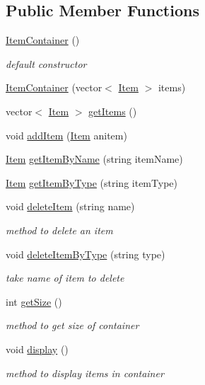 \subsection*{Public Member Functions}
\begin{DoxyCompactItemize}
\item 
\hypertarget{class_item_container_a3ce79c8b4501fafc5ea369ef3b3c1bce}{}\label{class_item_container_a3ce79c8b4501fafc5ea369ef3b3c1bce} 
\hyperlink{class_item_container_a3ce79c8b4501fafc5ea369ef3b3c1bce}{Item\+Container} ()
\begin{DoxyCompactList}\small\item\em default constructor \end{DoxyCompactList}\item 
\hyperlink{class_item_container_ab217646cacad74f4c9af8b5c4a0c26a3}{Item\+Container} (vector$<$ \hyperlink{class_item}{Item} $>$ items)
\item 
vector$<$ \hyperlink{class_item}{Item} $>$ \hyperlink{class_item_container_af941b43394daa4ca6720f5b4acd578e0}{get\+Items} ()
\item 
void \hyperlink{class_item_container_ab693023fa4d471748385cb0ae8a49413}{add\+Item} (\hyperlink{class_item}{Item} anitem)
\item 
\hyperlink{class_item}{Item} \hyperlink{class_item_container_a1a716afac56641809fd09d314ee1da3e}{get\+Item\+By\+Name} (string item\+Name)
\item 
\hyperlink{class_item}{Item} \hyperlink{class_item_container_a891f1db61620ef64a8907bc5554cbb42}{get\+Item\+By\+Type} (string item\+Type)
\item 
void \hyperlink{class_item_container_ac5d279c415c4ef60282c7b87a73a99b5}{delete\+Item} (string name)
\begin{DoxyCompactList}\small\item\em method to delete an item \end{DoxyCompactList}\item 
void \hyperlink{class_item_container_aeb9b5f9389de01eb93e44993251c2170}{delete\+Item\+By\+Type} (string type)
\begin{DoxyCompactList}\small\item\em take name of item to delete \end{DoxyCompactList}\item 
int \hyperlink{class_item_container_a5969e0b433f10e7d2683a85f310b9c1c}{get\+Size} ()
\begin{DoxyCompactList}\small\item\em method to get size of container \end{DoxyCompactList}\item 
void \hyperlink{class_item_container_abddcd9bd39e7a9df526a90a989e54c76}{display} ()
\begin{DoxyCompactList}\small\item\em method to display items in container \end{DoxyCompactList}\end{DoxyCompactItemize}
